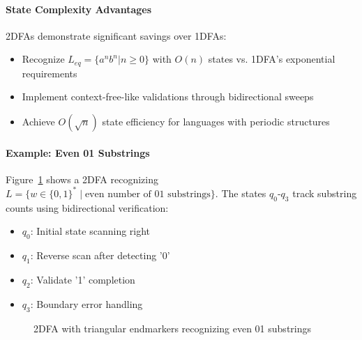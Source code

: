\paragraph{State Complexity Advantages}
2DFAs demonstrate significant savings over 1DFAs:
\begin{itemize}
    \item Recognize \( L_{eq} = \{a^n b^n | n \geq 0\} \) with \( O(n) \) states vs. 1DFA's exponential requirements \cite{yakaryilmaz2010succinctness}
    \item Implement context-free-like validations through bidirectional sweeps \cite{hopcroft2006introduction}
    \item Achieve \( O(\sqrt{n}) \) state efficiency for languages with periodic structures \cite{kondacs1997power}
\end{itemize}

\paragraph{Example: Even 01 Substrings}
Figure~\ref{fig:2dfa-example} shows a 2DFA recognizing \( L = \{w \in \{0,1\}^* \mid \text{even number of } 01 \text{ substrings}\} \). The states \( q_0 \)-\( q_3 \) track substring counts using bidirectional verification:
\begin{itemize}
    \item \( q_0 \): Initial state scanning right
    \item \( q_1 \): Reverse scan after detecting '0'
    \item \( q_2 \): Validate '1' completion
    \item \( q_3 \): Boundary error handling
\end{itemize}

\begin{figure}[h]
    \centering  
    \caption{2DFA with triangular endmarkers recognizing even 01 substrings}
    \label{fig:2dfa-example}
\end{figure}

